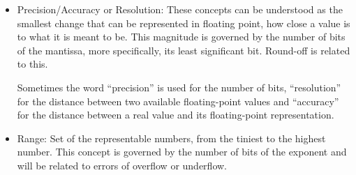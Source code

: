 \begin{itemize}
    \item Precision/Accuracy or Resolution: These concepts can be understood as the smallest change that can be represented in floating point, 
    how close a value is to what it is meant to be. This magnitude is governed by the number of bits of the mantissa, more specifically, its least significant bit. 
    Round-off is related to this. 
    
    Sometimes the word ``precision'' is used for the number of bits, 
    ``resolution'' for the distance between two available floating-point values and 
    ``accuracy'' for the distance between a real value and its floating-point representation. 

    \item Range: Set of the representable numbers, from the tiniest to the highest number. This concept is governed by the number of 
    bits of the exponent and will be related to errors of overflow or underflow. 
\end{itemize}



    

%







